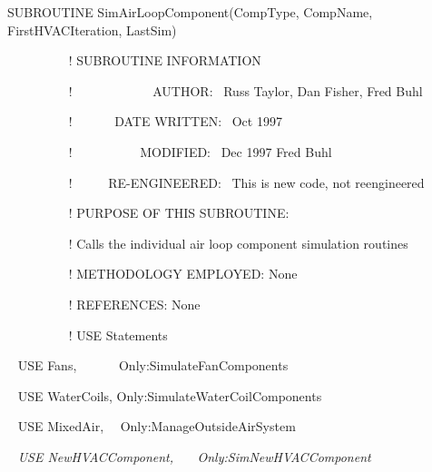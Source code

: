 SUBROUTINE SimAirLoopComponent(CompType, CompName, FirstHVACIteration, LastSim)

~~~~~~~~~ ! SUBROUTINE INFORMATION

~~~~~~~~~ !~~~~~~~~~~~~ AUTHOR:~ Russ Taylor, Dan Fisher, Fred Buhl

~~~~~~~~~ !~~~~~~ DATE WRITTEN:~ Oct 1997

~~~~~~~~~ !~~~~~~~~~~ MODIFIED:~ Dec 1997 Fred Buhl

~~~~~~~~~ !~~~~~ RE-ENGINEERED:~ This is new code, not reengineered

~~~~~~~~~ ! PURPOSE OF THIS SUBROUTINE:

~~~~~~~~~ ! Calls the individual air loop component simulation routines

~~~~~~~~~ ! METHODOLOGY EMPLOYED: None

~~~~~~~~~ ! REFERENCES: None

~~~~~~~~~ ! USE Statements

~ USE Fans,~~~~~~ Only:SimulateFanComponents

~ USE WaterCoils, Only:SimulateWaterCoilComponents

~ USE MixedAir,~~ Only:ManageOutsideAirSystem

~ \emph{USE NewHVACComponent,~~~ Only:SimNewHVACComponent}
